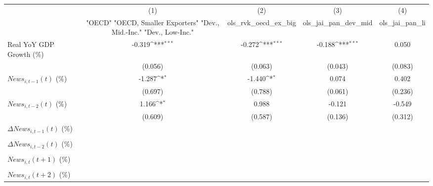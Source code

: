 {
\def\sym#1{\ifmmode^{#1}\else\(^{#1}\)\fi}
\begin{tabular}{l*{4}{c}}
\toprule
                    &\multicolumn{1}{c}{(1)}&\multicolumn{1}{c}{(2)}&\multicolumn{1}{c}{(3)}&\multicolumn{1}{c}{(4)}\\
                    &\multicolumn{1}{c}{ "OECD" "OECD, Smaller Exporters" "Dev., Mid.-Inc." "Dev., Low-Inc."}&\multicolumn{1}{c}{ols_rvk_oecd_ex_big}&\multicolumn{1}{c}{ols_jai_pan_dev_mid}&\multicolumn{1}{c}{ols_jai_pan_li}\\
\midrule
Real YoY GDP Growth (\%)&      -0.319\sym{***}&      -0.272\sym{***}&      -0.188\sym{***}&       0.050         \\
                    &     (0.056)         &     (0.063)         &     (0.043)         &     (0.083)         \\
\addlinespace
$ News_{i,t-1}(t)$ (\%)&      -1.287\sym{*}  &      -1.440\sym{*}  &       0.074         &       0.402         \\
                    &     (0.697)         &     (0.788)         &     (0.061)         &     (0.236)         \\
\addlinespace
$ News_{i,t-2}(t)$ (\%)&       1.166\sym{*}  &       0.988         &      -0.121         &      -0.549         \\
                    &     (0.609)         &     (0.587)         &     (0.136)         &     (0.312)         \\
\addlinespace
$ \Delta News_{i,t-1}(t)$ (\%)&                     &                     &                     &                     \\
                    &                     &                     &                     &                     \\
\addlinespace
$ \Delta News_{i,t-2}(t)$ (\%)&                     &                     &                     &                     \\
                    &                     &                     &                     &                     \\
\addlinespace
$ News_{i,t}(t+1)$ (\%)&                     &                     &                     &                     \\
                    &                     &                     &                     &                     \\
\addlinespace
$ News_{i,t}(t+2)$ (\%)&                     &                     &                     &                     \\

\end{tabular}}
